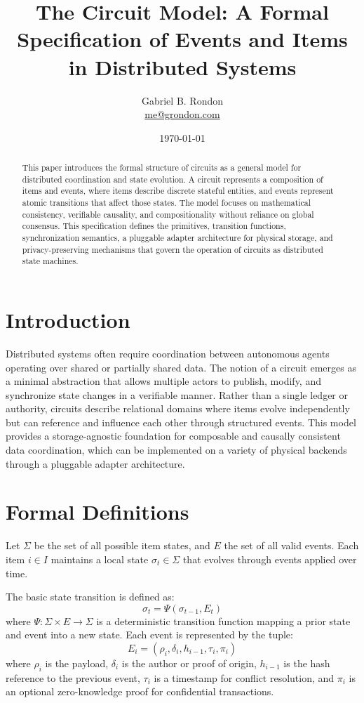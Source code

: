 \documentclass{article}
\title{\textbf{The Circuit Model: A Formal Specification of Events and Items in Distributed Systems}}
\author{Gabriel B. Rondon \\ \href{mailto:me@grondon.com}{me@grondon.com}}
\date{\today}
\begin{document}
\maketitle

\begin{abstract}
This paper introduces the formal structure of circuits as a general model for distributed coordination and state evolution. A circuit represents a composition of items and events, where items describe discrete stateful entities, and events represent atomic transitions that affect those states. The model focuses on mathematical consistency, verifiable causality, and compositionality without reliance on global consensus. This specification defines the primitives, transition functions, synchronization semantics, a pluggable adapter architecture for physical storage, and privacy-preserving mechanisms that govern the operation of circuits as distributed state machines.
\end{abstract}

\section{Introduction}

Distributed systems often require coordination between autonomous agents operating over shared or partially shared data. The notion of a circuit emerges as a minimal abstraction that allows multiple actors to publish, modify, and synchronize state changes in a verifiable manner. Rather than a single ledger or authority, circuits describe relational domains where items evolve independently but can reference and influence each other through structured events. This model provides a storage-agnostic foundation for composable and causally consistent data coordination, which can be implemented on a variety of physical backends through a pluggable adapter architecture.

\section{Formal Definitions}

Let $\Sigma$ be the set of all possible item states, and $E$ the set of all valid events. Each item $i \in I$ maintains a local state $\sigma_t \in \Sigma$ that evolves through events applied over time.

The basic state transition is defined as:
\begin{equation}
\sigma_{t} = \Psi(\sigma_{t-1}, E_t)
\end{equation}
where $\Psi : \Sigma \times E \to \Sigma$ is a deterministic transition function mapping a prior state and event into a new state. Each event is represented by the tuple:
\begin{equation}
E_i = (\rho_i, \delta_i, h_{i-1}, \tau_i, \pi_i)
\end{equation}
where $\rho_i$ is the payload, $\delta_i$ is the author or proof of origin, $h_{i-1}$ is the hash reference to the previous event, $\tau_i$ is a timestamp for conflict resolution, and $\pi_i$ is an optional zero-knowledge proof for confidential transactions.
\end{document}
